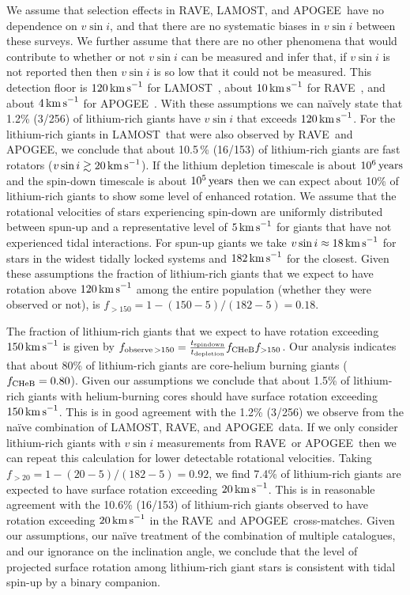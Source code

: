 \documentclass[twocolumn]{aastex62}
\newcommand\lamost{LAMOST}
\newcommand\apogee{APOGEE}
\newcommand\rave{RAVE}
\begin{document}
We assume that selection effects in \rave, \lamost, and \apogee\ 
have no dependence on $v\sin{i}$, and that there are no systematic biases in $v\sin{i}$ between these surveys. We further assume that there are no other phenomena that would contribute to whether or not $v\sin{i}$ can be measured and infer that, if $v\sin{i}$ is not reported then then $v\sin{i}$ is  so low that it could not be measured. This detection floor is $120\,{\rm km\,s}^{-1}$ for \lamost\ \citep{Frasca_2016}, about $10\,{\rm km\,s}^{-1}$ for \rave\ \citep{Siebert_2011}, 
and about $4\,{\rm km\,s}^{-1}$ for \apogee\ \citep{Deshpande_2013}.  With these assumptions we can na\"ively state that 1.2\% (3/256) of lithium-rich giants have $v\sin{i}$ that exceeds $120\,{\rm km\,s}^{-1}$. 
For the lithium-rich giants in \lamost\ that were also observed by \rave\ and \apogee,
we conclude that about 10.5\,\% (16/153) of lithium-rich giants are fast rotators ($v\sin{i} \gtrsim 20\,{\rm km\,s}^{-1}$). If the lithium depletion timescale is about $10^6\,{\rm years}$ and the spin-down timescale is about $10^5\,{\rm years}$ \citep{Tout_1992} then we can expect about 10\% of lithium-rich giants to show some level of enhanced rotation. We assume that the rotational velocities of stars experiencing spin-down are uniformly distributed between spun-up and  a representative level of $5\,{\rm km\,s}^{-1}$ for giants that have not experienced tidal interactions. 
For spun-up  giants we take $v\sin{i} \approx 18\,{\rm km\,s}^{-1}$ for stars in the widest tidally locked systems and $182\,{\rm km\,s}^{-1}$ for the closest. 
Given these assumptions the fraction of lithium-rich giants that we expect to have rotation above $120\,{\rm km\,s}^{-1}$  among the entire population (whether they were observed or not), is $f_{>150} = 1 - (150 - 5)/(182 - 5) = 0.18$. 


The fraction of lithium-rich giants that we expect to have rotation exceeding $150\,{\rm km\,s}^{-1}$ is given by $f_{{\rm observe}\,>150} = \frac{t_{\rm spindown}}{t_{\rm depletion}} f_{\rm CHeB} f_{>150}$. Our analysis indicates that about 80\% of lithium-rich giants are core-helium burning giants ($f_{\rm CHeB} = 0.80$). Given our assumptions we conclude that about 1.5\% of lithium-rich giants with helium-burning cores should have surface rotation exceeding $150\,{\rm km\,s}^{-1}$. This is in good agreement with the 1.2\% (3/256) we observe from the na\"ive combination of \lamost, \rave, and \apogee\ data. If we only consider lithium-rich giants with $v\sin{i}$ measurements from \rave\ or \apogee\ then we can repeat this calculation for lower detectable rotational velocities. Taking $f_{>20} = 1 - (20 - 5)/(182 - 5) = 0.92$, we find 7.4\% of lithium-rich giants are expected to have surface rotation exceeding $20\,{\rm km\,s}^{-1}$. This is in reasonable agreement with the 10.6\% (16/153) of lithium-rich giants observed to have rotation exceeding $20\,{\rm km\,s}^{-1}$ in the \rave\ and \apogee\ cross-matches. Given our assumptions,  our na\"ive treatment of the combination of multiple catalogues, and our ignorance on the inclination angle, we conclude that the level of projected surface rotation among lithium-rich giant stars is consistent with tidal spin-up by a binary companion.
\end{document}
